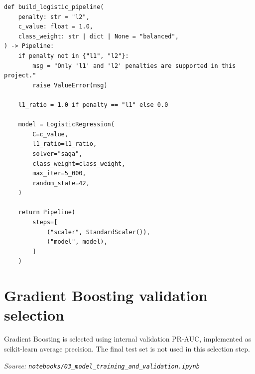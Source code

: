 \documentclass[10pt]{article}
\begin{document}
\begin{lstlisting}
def build_logistic_pipeline(
    penalty: str = "l2",
    c_value: float = 1.0,
    class_weight: str | dict | None = "balanced",
) -> Pipeline:
    if penalty not in {"l1", "l2"}:
        msg = "Only 'l1' and 'l2' penalties are supported in this project."
        raise ValueError(msg)

    l1_ratio = 1.0 if penalty == "l1" else 0.0

    model = LogisticRegression(
        C=c_value,
        l1_ratio=l1_ratio,
        solver="saga",
        class_weight=class_weight,
        max_iter=5_000,
        random_state=42,
    )

    return Pipeline(
        steps=[
            ("scaler", StandardScaler()),
            ("model", model),
        ]
    )
\end{lstlisting}

\section{Gradient Boosting validation selection}

Gradient Boosting is selected using internal validation PR-AUC, implemented as
scikit-learn average precision. The final test set is not used in this
selection step.

\textit{Source: \texttt{notebooks/03\_model\_training\_and\_validation.ipynb}}
\end{document}
